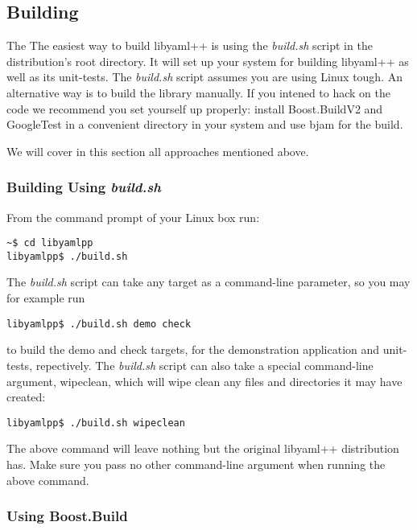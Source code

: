 \documentclass{article}
\begin{document}
\subsection{Building}

The The easiest way to build libyaml++ is using the \textit{build.sh} script in the
distribution's root directory.  It will set up your system for building
libyaml++ as well as its unit-tests.  The \textit{build.sh} script assumes you are using
Linux tough.  An alternative way is to build the library manually.  If you
intened to hack on the code we recommend you set yourself up properly:  install
Boost.BuildV2 and GoogleTest in a convenient directory in your system and use
bjam for the build.

We will cover in this section all approaches mentioned above.

\subsubsection{Building Using \textit{build.sh}}

From the command prompt of your Linux box run:

\begin{verbatim}
~$ cd libyamlpp
libyamlpp$ ./build.sh
\end{verbatim}

The \textit{build.sh} script can take any target as a command-line parameter, so you may
for example run

\begin{verbatim}
libyamlpp$ ./build.sh demo check
\end{verbatim}

to build the demo and check targets, for the demonstration application and
unit-tests, repectively.  The \textit{build.sh} script can also take a special
command-line argument, wipeclean, which will wipe clean any files and
directories it may have created:

\begin{verbatim}
libyamlpp$ ./build.sh wipeclean
\end{verbatim}

The above command will leave nothing but the original libyaml++ distribution
has.  Make sure you pass no other command-line argument when running the above
command.

\subsubsection{Using Boost.Build}
\end{document}
